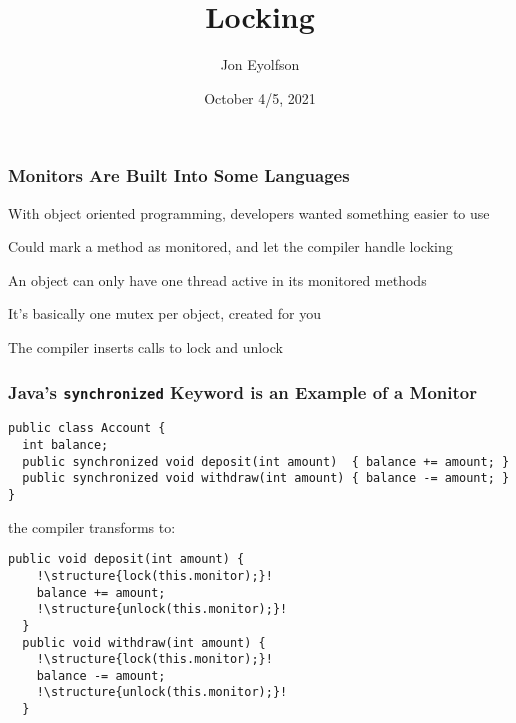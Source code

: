 

\title{Locking}
\author{Jon Eyolfson}
\date{October 4/5, 2021}


  \begin{frame}
    \titlepage
  \end{frame}

  \begin{frame}
    \frametitle{Monitors Are Built Into Some Languages}

    With object oriented programming, developers wanted something easier to use

    \vspace{2em}

    Could mark a method as monitored, and let the compiler handle locking

    \hspace{2em} An object can only have one thread active in its monitored
    methods

    \vspace{2em}

    It's basically one mutex per object, created for you

    \hspace{2em} The compiler inserts calls to lock and unlock
  \end{frame}

  \begin{frame}[fragile]
    \frametitle{Java's \texttt{synchronized} Keyword is an Example of a Monitor}

    \begin{lstlisting}
public class Account {
  int balance;
  public synchronized void deposit(int amount)  { balance += amount; }
  public synchronized void withdraw(int amount) { balance -= amount; }
}
    \end{lstlisting}

    the compiler transforms to:

    \begin{lstlisting}[escapechar=!]
  public void deposit(int amount) {
    !\structure{lock(this.monitor);}!
    balance += amount;
    !\structure{unlock(this.monitor);}!
  }
  public void withdraw(int amount) {
    !\structure{lock(this.monitor);}!
    balance -= amount;
    !\structure{unlock(this.monitor);}!
  }
    \end{lstlisting}
  \end{frame}

